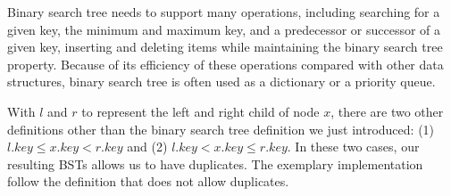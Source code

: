 \documentclass[main.tex]{subfiles}
\begin{document}
Binary search tree needs to support many operations, including searching for a given key, the minimum and maximum key, and a  predecessor or successor of a given key, inserting and deleting items while maintaining the binary search tree property. Because of its efficiency of these operations compared with other data structures,  binary search tree is often used as a dictionary or a priority queue.




With $l$ and $r$ to represent the left and right child of node $x$,  there are two other definitions other than the binary search tree definition we just introduced:  (1)$l.key \leq x.key < r.key$ and (2) $l.key  < x.key \leq r.key$. In these two cases, our resulting BSTs allows us to have duplicates. The exemplary implementation follow the definition that does not allow duplicates.



\end{document}
